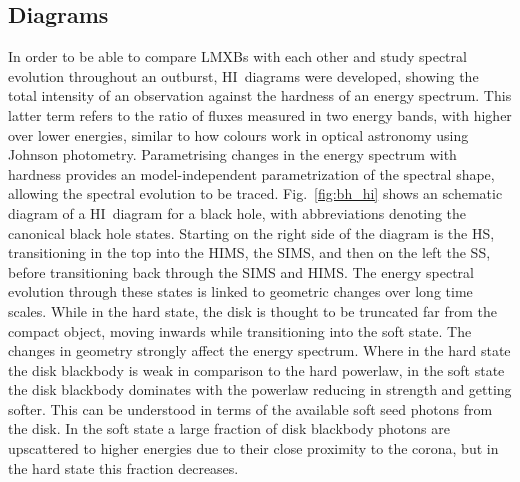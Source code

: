 \subsection{ Diagrams}
In order to be able to compare \acp{LMXB} with each other and study spectral evolution throughout an outburst, \ac{HI}~diagrams were developed, showing the total intensity of an observation against the hardness of an energy spectrum. This latter term refers to the ratio of fluxes measured in two energy bands, with higher over lower energies, similar to how colours work in optical astronomy using Johnson photometry. Parametrising changes in the energy spectrum with hardness provides an model-independent parametrization of the spectral shape, allowing the spectral evolution to be traced. Fig.~\ref{fig:bh_hi} shows an schematic diagram of a \ac{HI}~diagram for a black hole, with abbreviations denoting the canonical black hole states. Starting on the right side of the diagram is the \acf{HS}, transitioning in the top into the \acf{HIMS}, the \acf{SIMS}, and then on the left the \acf{SS}, before transitioning back through the \ac{SIMS} and \ac{HIMS}. The energy spectral evolution through these states is linked to geometric changes over long time scales. While in the hard state, the disk is thought to be truncated far from the compact object, moving inwards while transitioning into the soft state. The changes in geometry strongly affect the energy spectrum. Where in the hard state the disk blackbody is weak in comparison to the hard powerlaw, in the soft state the disk blackbody dominates with the powerlaw reducing in strength and getting softer. This can be understood in terms of the available soft seed photons from the disk. In the soft state a large fraction of disk blackbody photons are upscattered to higher energies due to their close proximity to the corona, but in the hard state this fraction decreases.\\

